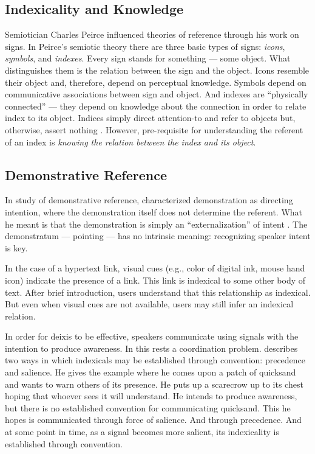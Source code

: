 \subsection{Indexicality and Knowledge}
\label{indexicalityandknowledge}

Semiotician Charles Peirce influenced theories of reference through his work on signs. In Peirce's semiotic theory there are three basic types of signs: \emph{icons}, \emph{symbols}, and \emph{indexes}. Every sign stands for something --- some object. What distinguishes them is the relation between the sign and the object. Icons resemble their object and, therefore, depend on perceptual knowledge. Symbols depend on communicative associations between sign and object. And indexes are ``physically connected'' --- they depend on knowledge about the connection in order to relate index to its object. Indices simply direct attention-to and refer to objects but, otherwise, assert nothing  \citep{Atkin:2005wd,Clark:2003tn}.  However, pre-requisite for understanding the referent of an index is \emph{knowing the relation between the index and its object}.

\subsection{Demonstrative Reference}
\label{demonstrativereference}

In study of demonstrative reference,  \citet{Kaplan:1980te}  characterized demonstration as directing intention, where the demonstration itself does not determine the referent. What he meant is that the demonstration is simply an ``externalization'' of intent  \citet[p. 589]{Kaplan:1980te}.  The demonstratum --- pointing --- has no intrinsic meaning: recognizing speaker intent is key.

In the case of a hypertext link, visual cues (e.g., color of digital ink, mouse hand icon) indicate the presence of a link. This link is indexical to some other body of text. After brief introduction, users understand that this relationship as indexical. But even when visual cues are not available, users may still infer an indexical relation.

In order for deixis to be effective, speakers communicate using signals with the intention to produce awareness. In this rests a coordination problem.  \citet{lewis69}  describes two ways in which indexicals may be established through convention: precedence and salience. He gives the example where he comes upon a patch of quicksand and wants to warn others of its presence. He puts up a scarecrow up to its chest hoping that whoever sees it will understand. He intends to produce awareness, but there is no established convention for communicating quicksand. This he hopes is communicated through force of salience. And through precedence. And at some point in time, as a signal becomes more salient, its indexicality is established through convention.

